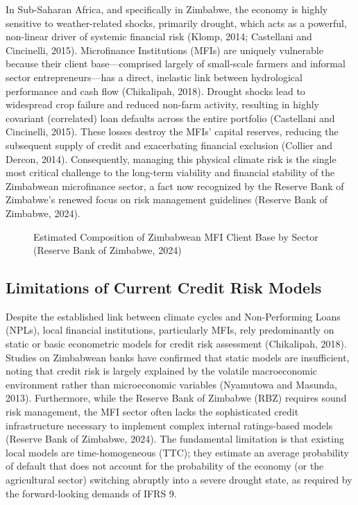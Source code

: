 \documentclass[12pt,a4paper]{article}
\begin{document}
In Sub-Saharan Africa, and specifically in Zimbabwe, the economy is highly sensitive to weather-related shocks, primarily drought, which acts as a powerful, non-linear driver of systemic financial risk (Klomp, 2014; Castellani and Cincinelli, 2015). Microfinance Institutions (MFIs) are uniquely vulnerable because their client base---comprised largely of small-scale farmers and informal sector entrepreneurs---has a direct, inelastic link between hydrological performance and cash flow (Chikalipah, 2018). Drought shocks lead to widespread crop failure and reduced non-farm activity, resulting in highly covariant (correlated) loan defaults across the entire portfolio (Castellani and Cincinelli, 2015). These losses destroy the MFIs' capital reserves, reducing the subsequent supply of credit and exacerbating financial exclusion (Collier and Dercon, 2014). Consequently, managing this physical climate risk is the single most critical challenge to the long-term viability and financial stability of the Zimbabwean microfinance sector, a fact now recognized by the Reserve Bank of Zimbabwe's renewed focus on risk management guidelines (Reserve Bank of Zimbabwe, 2024).

\begin{figure}[H]
\centering
{}
\caption{Estimated Composition of Zimbabwean MFI Client Base by Sector (Reserve Bank of Zimbabwe, 2024)}
\label{fig:mfi_composition}
\end{figure}

\subsection{Limitations of Current Credit Risk Models}

Despite the established link between climate cycles and Non-Performing Loans (NPLs), local financial institutions, particularly MFIs, rely predominantly on static or basic econometric models for credit risk assessment (Chikalipah, 2018). Studies on Zimbabwean banks have confirmed that static models are insufficient, noting that credit risk is largely explained by the volatile macroeconomic environment rather than microeconomic variables (Nyamutowa and Masunda, 2013). Furthermore, while the Reserve Bank of Zimbabwe (RBZ) requires sound risk management, the MFI sector often lacks the sophisticated credit infrastructure necessary to implement complex internal ratings-based models (Reserve Bank of Zimbabwe, 2024). The fundamental limitation is that existing local models are time-homogeneous (TTC); they estimate an average probability of default that does not account for the probability of the economy (or the agricultural sector) switching abruptly into a severe drought state, as required by the forward-looking demands of IFRS 9.
\end{document}
